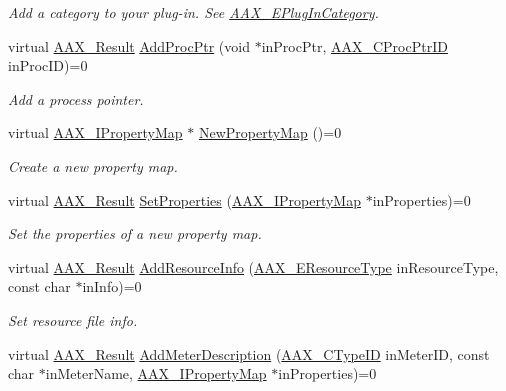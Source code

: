 \begin{DoxyCompactItemize}
\begin{DoxyCompactList}\small\item\em Add a category to your plug-\/in. See \mbox{\hyperlink{a00491_aef9637518fb1ac0e2f403444c73aba4a}{A\+A\+X\+\_\+\+E\+Plug\+In\+Category}}. \end{DoxyCompactList}\item 
virtual \mbox{\hyperlink{a00392_a4d8f69a697df7f70c3a8e9b8ee130d2f}{A\+A\+X\+\_\+\+Result}} \mbox{\hyperlink{a01813_ad1a286ef7cb869e6f79423dd774ec976}{Add\+Proc\+Ptr}} (void $\ast$in\+Proc\+Ptr, \mbox{\hyperlink{a00401_af0682195d377392ad356fd2b00c36892}{A\+A\+X\+\_\+\+C\+Proc\+Ptr\+ID}} in\+Proc\+ID)=0
\begin{DoxyCompactList}\small\item\em Add a process pointer. \end{DoxyCompactList}\item 
virtual \mbox{\hyperlink{a01869}{A\+A\+X\+\_\+\+I\+Property\+Map}} $\ast$ \mbox{\hyperlink{a01813_ac90c1b595d65259f798429474bbe926f}{New\+Property\+Map}} ()=0
\begin{DoxyCompactList}\small\item\em Create a new property map. \end{DoxyCompactList}\item 
virtual \mbox{\hyperlink{a00392_a4d8f69a697df7f70c3a8e9b8ee130d2f}{A\+A\+X\+\_\+\+Result}} \mbox{\hyperlink{a01813_ac57ed8597814db525eb69a2d2bfd9d87}{Set\+Properties}} (\mbox{\hyperlink{a01869}{A\+A\+X\+\_\+\+I\+Property\+Map}} $\ast$in\+Properties)=0
\begin{DoxyCompactList}\small\item\em Set the properties of a new property map. \end{DoxyCompactList}\item 
virtual \mbox{\hyperlink{a00392_a4d8f69a697df7f70c3a8e9b8ee130d2f}{A\+A\+X\+\_\+\+Result}} \mbox{\hyperlink{a01813_a3326bd8e29690a352408539029a50a61}{Add\+Resource\+Info}} (\mbox{\hyperlink{a00491_ae2805e88175d975589153a04e42898bb}{A\+A\+X\+\_\+\+E\+Resource\+Type}} in\+Resource\+Type, const char $\ast$in\+Info)=0
\begin{DoxyCompactList}\small\item\em Set resource file info. \end{DoxyCompactList}\item 
virtual \mbox{\hyperlink{a00392_a4d8f69a697df7f70c3a8e9b8ee130d2f}{A\+A\+X\+\_\+\+Result}} \mbox{\hyperlink{a01813_a7b89727b793c1b57a3815e59868c2713}{Add\+Meter\+Description}} (\mbox{\hyperlink{a00392_ac678f9c1fbcc26315d209f71a147a175}{A\+A\+X\+\_\+\+C\+Type\+ID}} in\+Meter\+ID, const char $\ast$in\+Meter\+Name, \mbox{\hyperlink{a01869}{A\+A\+X\+\_\+\+I\+Property\+Map}} $\ast$in\+Properties)=0

\end{DoxyCompactItemize}
